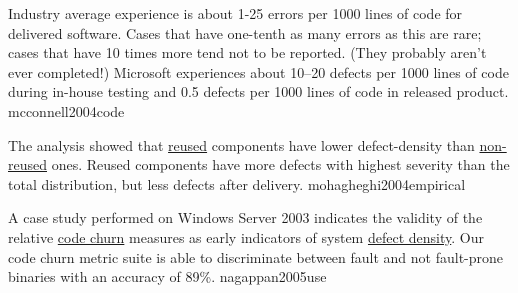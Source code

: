 \documentclass{article}
\begin{document}

  {Industry average experience is about 1-25 errors per 1000 lines of code for delivered software. Cases that have one-tenth as many errors as this are rare; cases that have 10 times more tend not to be reported. (They probably aren't ever completed!) Microsoft experiences about 10–20 defects per 1000 lines of code during in-house testing and 0.5 defects per 1000 lines of code in released product.}
  {mcconnell2004code}

  {The analysis showed that \ul{reused} components have lower defect-density than \ul{non-reused} ones. Reused components have more defects with highest severity than the total distribution, but less defects after delivery.}
  {mohagheghi2004empirical}

  {A case study performed on Windows Server 2003 indicates the validity of the relative \ul{code churn} measures as early indicators of system \ul{defect density}. Our code churn metric suite is able to discriminate between fault and not fault-prone binaries with an accuracy of 89\%.}
  {nagappan2005use}
\end{document}
